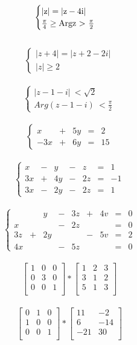\documentclass[a4paper]{article}
\begin{document}
$$ \begin{cases} 
{\rm |z|} = {\rm |z-4i|}\\
\frac{\pi}{4} \geq {\rm Arg z} \ {>} \  \frac{\pi}{2}
\end{cases}$$
\\
$$ \begin{cases}
{|z+4|} = {|z+2-2i|} \\
{|z|} \geq {2} \end{cases}$$
\\
$$ \begin{cases}
{|z-1-i|} \ < \sqrt{2} \\
{Arg(z-1-i)} \ < \frac{\pi}{2}
\end{cases}$$
\\
$$ \left\{ 
\begin{array}{rrrrr}
x & + & 5y & = & 2 \\
-3x & + & 6y & = &15
\end{array}
\right. $$
\\
$$ \left\{
\begin{array}{rrrrrrrrr}
x & - & y & - & z & = & 1\\
3x & + & 4y & - & 2z & = & -1\\
3x & - & 2y & -& 2z & = & 1 
\end{array}
\right. $$
\\
$$ \left\{
\begin{array}{rrrrrrrrr}
\ & \ & y & - & 3z& + & 4v & = & 0 \\
x &  \ & \ & - & 2z& \ & \ & = & 0 \\
3z & + & 2y & \ & \ & - & 5v & = & 2\\
4x & \ & \ & - & 5z & \ & \ & = & 0 
\end{array}
\right. $$
\\
$$\begin{bmatrix}
1 & 0 & 0 \\
0 & 3 & 0 \\
0 & 0 & 1 \\
\end{bmatrix}
*
\begin{bmatrix}
1 & 2 & 3 \\
3 & 1 & 2 \\
5 & 1 & 3 \\
\end{bmatrix}$$
\\
$$\begin{bmatrix}
0 & 1 & 0 \\
1 & 0 & 0 \\
0 & 0 & 1 \\
\end{bmatrix}
*
\begin{bmatrix}
11 & -2 \\
6 & -14   \\
-21 & 30  \\
\end{bmatrix}$$
\end{document}
